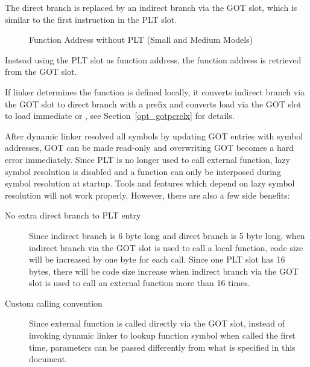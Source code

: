 The direct branch is replaced by an indirect branch via the GOT slot,
which is similar to the first instruction in the PLT slot.

\begin{figure}[H]
\Hrule
\caption{Function Address without PLT (Small and Medium Models)}
\begin{center}
\small{}
\end{center}
\Hrule
\end{figure}

Instead using the PLT slot as function address, the function address
is retrieved from the GOT slot.

If linker determines the function is defined locally, it converts
indirect branch via the GOT slot to direct branch with a 
prefix and converts load via the GOT slot to load immediate or
, see Section~\ref{opt_gotpcrelx} for details.

After dynamic linker resolved all symbols by updating GOT entries with
symbol addresses, GOT can be made read-only and overwriting GOT becomes
a hard error immediately.  Since PLT is no longer used to call external
function, lazy symbol resolution is disabled and a function can only be
interposed during symbol resolution at startup.  Tools and features which
depend on lazy symbol resolution will not work properly.  However, there
are also a few side benefits:

\begin{description}
\item[No extra direct branch to PLT entry]  Since indirect branch is 6
  byte long and direct branch is 5 byte long, when indirect branch via
  the GOT slot is used to call a local function, code size will be
  increased by one byte for each call.  Since one PLT slot has 16 bytes,
  there will be code size increase when indirect branch via the GOT slot
  is used to call an external function more than 16 times.
\item[Custom calling convention]  Since external function is called
  directly via the GOT slot, instead of invoking dynamic linker to
  lookup function symbol when called the first time, parameters can be
  passed differently from what is specified in this document.
\end{description}

